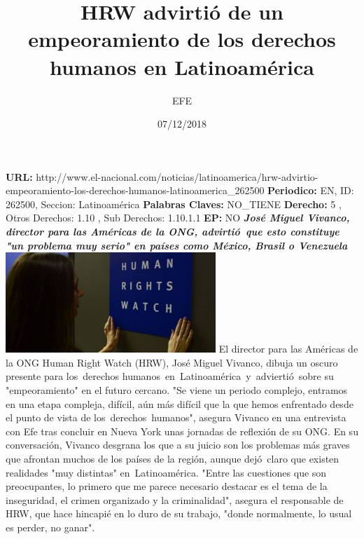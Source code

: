 \documentclass{article}%
\title{\textbf{HRW advirtió de un empeoramiento de los derechos humanos en Latinoamérica}}%
\author{EFE}%
\date{07/12/2018}%
\begin{document}
%
\normalsize%
\maketitle%
\textbf{URL: }%
http://www.el{-}nacional.com/noticias/latinoamerica/hrw{-}advirtio{-}empeoramiento{-}los{-}derechos{-}humanos{-}latinoamerica\_262500\newline%
%
\textbf{Periodico: }%
EN, %
ID: %
262500, %
Seccion: %
Latinoamérica\newline%
%
\textbf{Palabras Claves: }%
NO\_TIENE\newline%
%
\textbf{Derecho: }%
5%
, Otros Derechos: %
1.10%
, Sub Derechos: %
1.10.1.1%
\newline%
%
\textbf{EP: }%
NO\newline%
\newline%
%
\textbf{\textit{José Miguel Vivanco, director para las Américas de la ONG, advirtió~que esto constituye "un problema muy serio" en países como México, Brasil o Venezuela}}%
\newline%
\newline%
%
\includegraphics[width=300px]{189.jpg}%
\newline%
%
El director para las Américas de la ONG Human Right Watch (HRW), José Miguel Vivanco, dibuja un oscuro presente para los~derechos humanos~en~Latinoamérica~y~adviertió~sobre su "empeoramiento" en el futuro cercano.%
\newline%
%
"Se viene un periodo complejo, entramos en una etapa compleja, difícil, aún más difícil que la que hemos enfrentado desde el punto de vista de los~derechos~humanos", asegura Vivanco en una entrevista con Efe tras concluir en Nueva York unas jornadas de reflexión de su ONG.%
\newline%
%
En su conversación, Vivanco desgrana los que a su juicio son los problemas más graves que afrontan muchos de los países de la región, aunque dejó~claro que existen realidades "muy distintas" en~Latinoamérica.%
\newline%
%
"Entre las cuestiones que son preocupantes, lo primero que me parece necesario destacar es el tema de la inseguridad, el crimen organizado y la criminalidad", asegura el responsable de HRW, que hace hincapié en lo duro de su trabajo, "donde normalmente, lo usual es perder, no ganar".%
\end{document}
